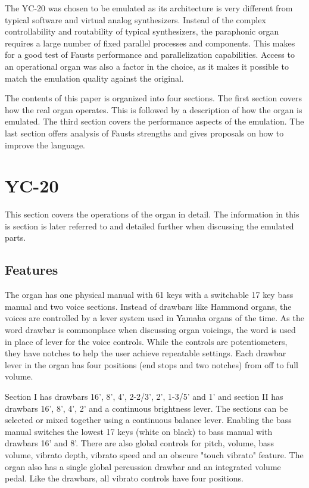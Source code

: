 \documentclass[11pt,a4paper]{article}
\begin{document}
The YC-20 was chosen to be emulated as its architecture is very different from typical software and virtual analog synthesizers. Instead of the complex controllability and routability of typical synthesizers, the paraphonic organ requires a large number of fixed parallel processes and components. This makes for a good test of Fausts performance and parallelization capabilities. Access to an operational organ was also a factor in the choice, as it makes it possible to match the emulation quality against the original. 

The contents of this paper is organized into four sections. The first section covers how the real organ operates. This is followed by a description of how the organ is emulated. The third section covers the performance aspects of the emulation. The last section offers analysis of Fausts strengths and gives proposals on how to improve the language.

\section{YC-20}
\label{section:yc-20}

This section covers the operations of the organ in detail\cite{yamaha:yc20}. The information in this is section is later referred to and detailed further when discussing the emulated parts.

\subsection{Features}

The organ has one physical manual with 61 keys with a switchable 17 key bass manual and two voice sections. Instead of drawbars like Hammond organs, the voices are controlled by a lever system used in Yamaha organs of the time. As the word drawbar is commonplace when discussing organ voicings, the word is used in place of lever for the voice controls. While the controls are potentiometers, they have notches to help the user achieve repeatable settings. Each drawbar lever in the organ has four positions (end stops and two notches) from off to full volume. 

Section I has drawbars 16', 8', 4', 2-2/3', 2', 1-3/5' and 1' and section II has drawbars 16', 8', 4', 2' and a continuous brightness lever. The sections can be selected or mixed together using a continuous balance lever. Enabling the bass manual switches the lowest 17 keys (white on black) to bass manual with drawbars 16' and 8'. There are also global controls for pitch, volume, bass volume, vibrato depth, vibrato speed and an obscure "touch vibrato" feature. The organ also has a single global percussion drawbar and an integrated volume pedal. Like the drawbars, all vibrato controls have four positions.
\end{document}
